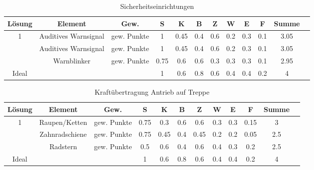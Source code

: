 \documentclass[10pt,a4paper]{article}
\begin{document}
\begin{table}[h!]
    \centering
    \begin{tabular}{cccccccccccc}
        \toprule
        \textbf{Lösung} & \textbf{Element}     & \textbf{Gew.} & \textbf{S} & \textbf{K} & \textbf{B} & \textbf{Z} & \textbf{W} & \textbf{E} & \textbf{F} & \textbf{Summe} & \\
        \midrule
        1               & Auditives Warnsignal & gew. Punkte   & 1          & 0.45       & 0.4        & 0.6        & 0.2        & 0.3        & 0.1        & 3.05             \\
        \addlinespace
        2               & Auditives Warnsignal & gew. Punkte   & 1          & 0.45       & 0.4        & 0.6        & 0.2        & 0.3        & 0.1        & 3.05             \\
        \addlinespace
        3               & Warnblinker          & gew. Punkte   & 0.75       & 0.6        & 0.6        & 0.3        & 0.3        & 0.3        & 0.1        & 2.95             \\
        \midrule
        Ideal           &                      &               & 1          & 0.6        & 0.8        & 0.6        & 0.4        & 0.4        & 0.2        & 4                \\
        \bottomrule
    \end{tabular}
    \caption{Sicherheitseinrichtungen}
    \label{tab:sicherheitseinrichtungen}
\end{table}

\begin{table}[h!]
    \centering
    \begin{tabular}{cccccccccccc}
        \toprule
        \textbf{Lösung} & \textbf{Element} & \textbf{Gew.} & \textbf{S} & \textbf{K} & \textbf{B} & \textbf{Z} & \textbf{W} & \textbf{E} & \textbf{F} & \textbf{Summe} & \\
        \midrule
        1               & Raupen/Ketten    & gew. Punkte   & 0.75       & 0.3        & 0.6        & 0.6        & 0.3        & 0.3        & 0.15       & 3                \\
        \addlinespace
        2               & Zahnradschiene   & gew. Punkte   & 0.75       & 0.45       & 0.4        & 0.45       & 0.2        & 0.2        & 0.05       & 2.5              \\
        \addlinespace
        3               & Radstern         & gew. Punkte   & 0.5        & 0.6        & 0.4        & 0.6        & 0.4        & 0.3        & 0.2        & 2.5              \\
        \midrule
        Ideal           &                  &               & 1          & 0.6        & 0.8        & 0.6        & 0.4        & 0.4        & 0.2        & 4                \\
        \bottomrule
    \end{tabular}
    \caption{Kraftübertragung Antrieb auf Treppe}
    \label{tab:kraftuebertragung}
\end{table}
\FloatBarrier
\end{document}
